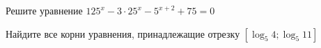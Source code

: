 \begin{ex}
	\begin{condition}
		\begin{enumcols}[label=\asbuk*)]
			\item Решите уравнение \( 125^x - 3\cdot 25^x -5^{x+2} + 75 = 0  \)
			\item Найдите все корни уравнения, принадлежащие отрезку \( \left[\log_5 4;\log_5 11\right] \)
		\end{enumcols}
	\end{condition}
\end{ex}